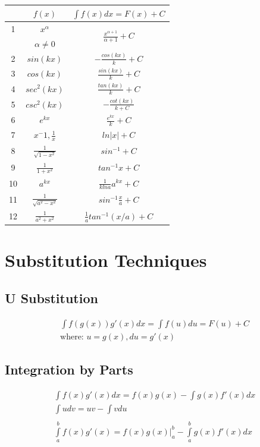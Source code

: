 \documentclass[12pt, letterpaper]{article}
\begin{document}
\begin{center}
\begin{tabular}{|c|c|c|}
\hline
& $f(x)$ & $\int\limits f(x) dx = F(x) + C $\\
\hline
1 & $x^\alpha$ & \multirow{2}{4em}{$\frac{x^{\alpha + 1}}{\alpha + 1} + C$}\\
  & $\alpha \neq 0$ &\\
\hline
2 & $sin(kx)$ & $-\frac{cos(kx)}{k} + C$\\
\hline
3 & $cos(kx)$ & $\frac{sin(kx)}{k} + C$\\
\hline
4 & $sec^2(kx)$ & $\frac{tan(kx)}{k} + C$\\
\hline
5 & $csc^2(kx)$ & $-\frac{cot(kx)}{k+C}$\\
\hline
6 & $e^{kx}$ & $\frac{e^{kx}}{k} + C$\\
\hline
7 & $x^-1 , \frac{1}{x}$ & $ln|x| + C$\\
\hline
8 & $\frac{1}{\sqrt{1-x^2}}$ & $sin^{-1} + C$\\
\hline
9 & $\frac{1}{1+x^2}$ & $tan^{-1}x + C$\\
\hline
10 & $a^{kx}$ & $\frac{1}{k ln a} a^{kx} + C$\\
\hline
11 & $\frac{1}{\sqrt{a^2-x^2}}$ & $sin^{-1} \frac{x}{a} + C$\\
\hline
12 & $\frac{1}{a^2 + x^2}$ & $\frac{1}{a} tan^{-1}(x/a) + C$\\
\hline
\end{tabular}
\end{center}

\section{Substitution Techniques}
\subsection{U Substitution}
\begin{gather*}
  \int\limits f(g(x)) g'(x) dx = \int\limits f(u) du = F(u) + C\\
  \text{where: } u = g(x), du =g'(x)
\end{gather*}

\subsection{Integration by Parts}
\begin{gather*}
  \int\limits f(x) g'(x) dx = f(x) g(x) - \int\limits g(x) f'(x) dx\\
  \int\limits u dv = u v - \int\limits v du\\
  \\
  \int\limits _a^b f(x)g'(x) = f(x)g(x) \Big| _a^b - \int\limits _a^b g(x)f'(x) dx
\end{gather*}
\end{document}
